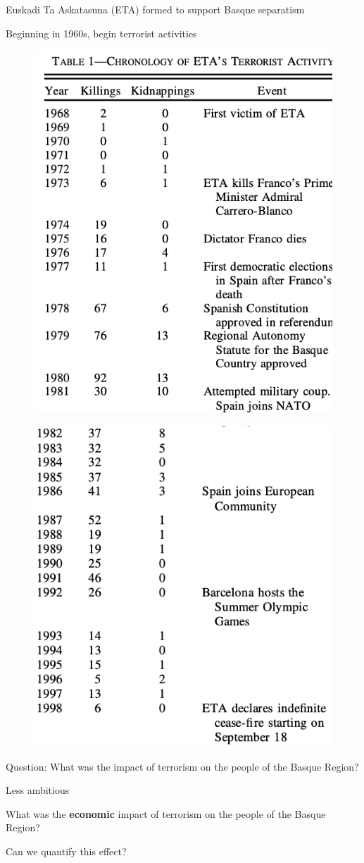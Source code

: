 \documentclass[notes,11pt, aspectratio=169]{beamer}
\newenvironment{wideitemize}{\itemize\addtolength{\itemsep}{10pt}}{\enditemize}
\begin{document}
\begin{frame}
    \begin{wideitemize}
        \item Euskadi Ta Askatasuna (ETA) formed to support Basque separatism
        \item Beginning in 1960s, begin terrorist activities
    \end{wideitemize}
\end{frame}

\begin{frame}
    \begin{figure}
        \includegraphics[width = .4\linewidth]{figures/tab11.png}
    \end{figure}
\end{frame}

\begin{frame}
    \begin{figure}
        \includegraphics[width = .4\linewidth]{figures/tab12.png}
    \end{figure}
\end{frame}

\begin{frame}{}
    \begin{wideitemize}
        \item Question: What was the impact of terrorism on the people of the Basque Region? \pause 
        \item Less ambitious
        \begin{wideitemize} 
            \item What was the \textbf{economic} impact of terrorism on the people of the Basque Region? 
            \item Can we quantify this effect?
        \end{wideitemize}
    \end{wideitemize}
\end{frame}
\end{document}
